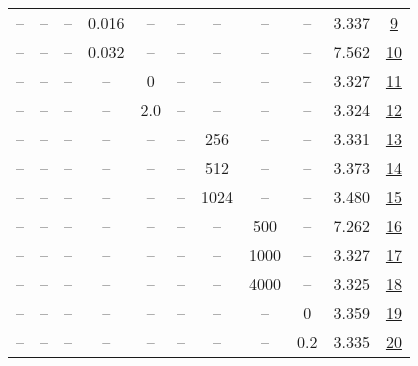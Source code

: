 \begin{table}[H]
\begin{tabular}{ccccccccccc}
-- & -- & -- & 0.016 & -- & -- & -- & -- & -- & 3.337 & \href{https://wandb.ai/stanford-mercury/optimizer-scaling/runs/sweep-130m-10B-adamwdc4f18lr0.016-wd0.1-minlr0-warmup2000-b10.9--5e227e}{9} \\
-- & -- & -- & 0.032 & -- & -- & -- & -- & -- & 7.562 & \href{https://wandb.ai/stanford-mercury/optimizer-scaling/runs/sweep-130m-10B-adamwa3cb44lr0.032-wd0.1-minlr0-warmup2000-b10.9--669760}{10} \\
-- & -- & -- & -- & 0 & -- & -- & -- & -- & 3.327 & \href{https://wandb.ai/stanford-mercury/optimizer-scaling/runs/sweep-130m-10B-adamw8a71b5lr0.008-wd0.1-minlr0-warmup2000-b10.9--7e2f5e}{11} \\
-- & -- & -- & -- & 2.0 & -- & -- & -- & -- & 3.324 & \href{https://wandb.ai/stanford-mercury/optimizer-scaling/runs/sweep-130m-10B-adamw2c7533lr0.008-wd0.1-minlr0-warmup2000-b10.9--1aabfe}{12} \\
-- & -- & -- & -- & -- & -- & 256 & -- & -- & 3.331 & \href{https://wandb.ai/stanford-mercury/optimizer-scaling/runs/sweep-130m-10B-adamw90f5c1lr0.008-wd0.1-minlr0-warmup2000-b10.9--68bff2}{13} \\
-- & -- & -- & -- & -- & -- & 512 & -- & -- & 3.373 & \href{https://wandb.ai/stanford-mercury/optimizer-scaling/runs/sweep-130m-10B-adamw5098e9lr0.008-wd0.1-minlr0-warmup2000-b10.9--3dd991}{14} \\
-- & -- & -- & -- & -- & -- & 1024 & -- & -- & 3.480 & \href{https://wandb.ai/stanford-mercury/optimizer-scaling/runs/sweep-130m-10B-adamw7fa927lr0.008-wd0.1-minlr0-warmup2000-b10.9--5e34ba}{15} \\
-- & -- & -- & -- & -- & -- & -- & 500 & -- & 7.262 & \href{https://wandb.ai/stanford-mercury/optimizer-scaling/runs/sweep-130m-10B-adamw479b6elr0.008-wd0.1-minlr0-warmup500-b10.9-b-029688}{16} \\
-- & -- & -- & -- & -- & -- & -- & 1000 & -- & 3.327 & \href{https://wandb.ai/stanford-mercury/optimizer-scaling/runs/sweep-130m-10B-adamwc00703lr0.008-wd0.1-minlr0-warmup1000-b10.9--40ceef}{17} \\
-- & -- & -- & -- & -- & -- & -- & 4000 & -- & 3.325 & \href{https://wandb.ai/stanford-mercury/optimizer-scaling/runs/sweep-130m-10B-adamwb9e54alr0.008-wd0.1-minlr0-warmup4000-b10.9--eee94b}{18} \\
-- & -- & -- & -- & -- & -- & -- & -- & 0 & 3.359 & \href{https://wandb.ai/stanford-mercury/optimizer-scaling/runs/sweep-130m-10B-adamw76e938lr0.008-wd0-minlr0-warmup2000-b10.9-b2-6ac315}{19} \\
-- & -- & -- & -- & -- & -- & -- & -- & 0.2 & 3.335 & \href{https://wandb.ai/stanford-mercury/optimizer-scaling/runs/sweep-130m-10B-adamweb3777lr0.008-wd0.2-minlr0-warmup2000-b10.9--c002ef}{20} \\
\bottomrule
\end{tabular}
\end{table}

